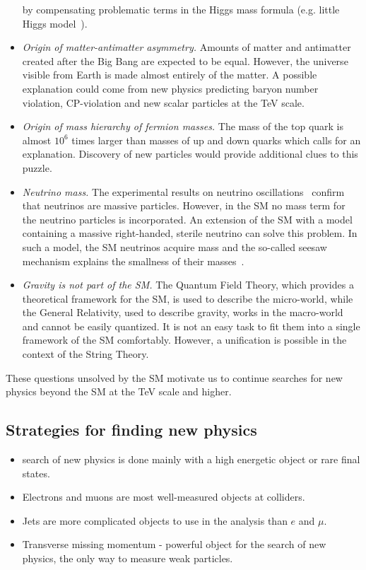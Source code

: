\begin{itemize}
by compensating problematic terms in the Higgs mass formula (e.g. little Higgs model~\cite{Brak}).
\item \textit{Origin of matter-antimatter asymmetry.} Amounts of matter and antimatter created after the Big Bang are expected to be equal. However, the universe visible from Earth is made almost entirely of the matter.
A possible explanation could come from new physics predicting baryon number violation, CP-violation and new scalar particles at the TeV scale.
\item \textit{Origin of mass hierarchy of fermion masses.} The mass of the top quark is almost $10^6$ times larger than masses of up and down quarks which calls for an explanation. Discovery of new particles would provide additional clues to this puzzle.
\item \textit{Neutrino mass.} The experimental results on neutrino oscillations~\cite{Fukuda:1998fd} confirm that neutrinos are massive particles. However, in the SM no mass term for the neutrino particles is incorporated. An extension of the SM with a model containing a massive right-handed, sterile neutrino can solve this problem. In such a model, the SM neutrinos acquire mass and the so-called seesaw mechanism explains the smallness of their masses~\cite{Mohapatra:1979ia}.
\item \textit{Gravity is not part of the SM.} The Quantum Field Theory, which provides a theoretical framework for the SM, is used to describe the micro-world, while the General Relativity, used to describe gravity, works in the macro-world and cannot be easily quantized. It is not an easy task to fit them into a single framework of the SM comfortably. However, a unification is possible in the context of the String Theory.
\end{itemize}

These questions unsolved by the SM motivate us to continue searches for new physics beyond the SM at the TeV scale and higher.

\subsection{Strategies for finding new physics}

\begin{itemize}
 \item search of new physics is done mainly with a high energetic object or rare final states.
 \item Electrons and muons are most well-measured objects at colliders.
 \item Jets are more complicated objects to use in the analysis than $e$ and $\mu$.
 \item Transverse missing momentum - powerful object for the search of new physics, the only way to measure weak particles.
\end{itemize}


